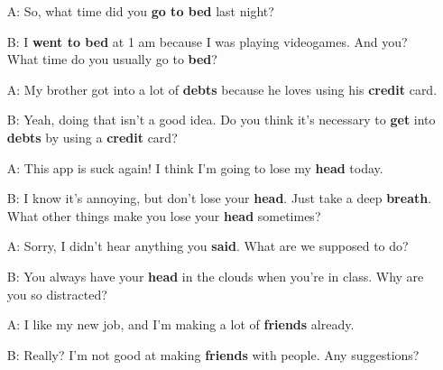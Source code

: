 \begin{itemize}
  \item[A:] So, what time did you \textbf{go to b\textcolor{fancyorange}{e}d} last night?
  \item[B:] I \textbf{w\textcolor{fancyorange}{e}nt to b\textcolor{fancyorange}{e}d} at 1 am because I was playing videogames. And you? What time do you usually go to \textbf{b\textcolor{fancyorange}{e}d}?
\end{itemize}

\begin{itemize}
  \item[A:] My brother got into a lot of \textbf{d\textcolor{fancyorange}{e}bts} because he loves using his \textbf{cr\textcolor{fancyorange}{e}dit} card.
  \item[B:] Yeah, doing that isn't a good idea. Do you think it's necessary to \textbf{g\textcolor{fancyorange}{e}t} into \textbf{d\textcolor{fancyorange}{e}bts} by using a \textbf{cr\textcolor{fancyorange}{e}dit} card?
\end{itemize}

\begin{itemize}
  \item[A:] This app is suck again! I think I'm going to lose my \textbf{h\textcolor{fancyorange}{e}ad} today.
  \item[B:] I know it's annoying, but don't lose your \textbf{h\textcolor{fancyorange}{e}ad}. Just take a deep \textbf{br\textcolor{fancyorange}{e}ath}. What other things make you lose your \textbf{h\textcolor{fancyorange}{e}ad} sometimes?
\end{itemize}

\begin{itemize}
  \item[A:] Sorry, I didn't hear anything you \textbf{s\textcolor{fancyorange}{a}id}. What are we supposed to do?
  \item[B:] You always have your \textbf{h\textcolor{fancyorange}{e}ad} in the clouds when you're in class. Why are you so distracted?
\end{itemize}

\begin{itemize}
  \item[A:] I like my new job, and I'm making a lot of \textbf{fr\textcolor{fancyorange}{ie}nds} already.
  \item[B:] Really? I'm not good at making \textbf{fr\textcolor{fancyorange}{ie}nds} with people. Any suggestions?
\end{itemize}

